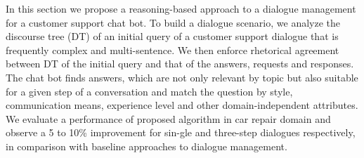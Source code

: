 In this section we propose a reasoning-based approach to a dialogue management for a customer support chat bot. To build a dialogue scenario, we analyze the discourse tree (DT) of an initial query of a customer support dialogue that is frequently complex and multi-sentence. We then enforce rhetorical agreement between DT of the initial query and that of the answers, requests and responses. The chat bot finds answers, which are not only relevant by topic but also suitable for a given step of a conversation and match the question by style, communication means, experience level and other domain-independent attributes. We evaluate a performance of proposed algorithm in car repair domain and observe a 5 to 10\% improvement for sin-gle and three-step dialogues respectively, in comparison with baseline approaches to dialogue management.
